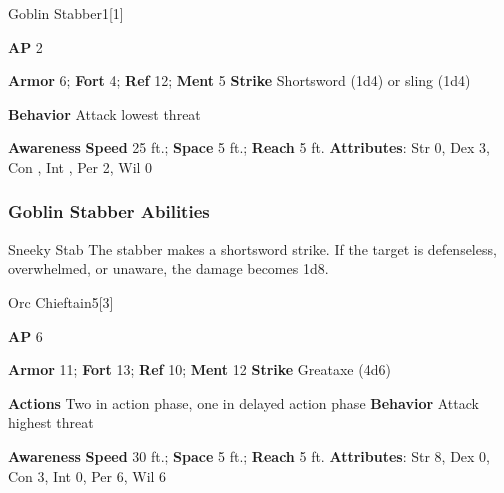 \begin{monsection}{Goblin Stabber}{1}[1]
\vspace{-1em}\vspace{-1em}
\begin{spellcontent}
\begin{spelltargetinginfo}
{\textbf{AP} 2}

\pari \textbf{Armor} 6;
\textbf{Fort} 4;
\textbf{Ref} 12;
\textbf{Ment} 5
\pari \textbf{Strike} Shortsword  (1d4) or sling  (1d4)



\pari \textbf{Behavior} Attack lowest threat
\end{spelltargetinginfo}
\end{spellcontent}

\begin{monsterfooter}
\pari \textbf{Awareness} 
\pari \textbf{Speed} 25 ft.;
\textbf{Space} 5 ft.;
\textbf{Reach} 5 ft.
\pari \textbf{Attributes}:
Str 0,
Dex 3,
Con ,
Int ,
Per 2,
Wil 0
\end{monsterfooter}
\end{monsection}


\subsubsection{Goblin Stabber Abilities}

\begin{ability}{Sneeky Stab}
The stabber makes a shortsword strike.
If the target is defenseless, overwhelmed, or unaware, the damage becomes 1d8.
\end{ability}






\begin{monsection}{Orc Chieftain}{5}[3]
\vspace{-1em}\vspace{-1em}
\begin{spellcontent}
\begin{spelltargetinginfo}
{\textbf{AP} 6}

\pari \textbf{Armor} 11;
\textbf{Fort} 13;
\textbf{Ref} 10;
\textbf{Ment} 12
\pari \textbf{Strike} Greataxe  (4d6)


\pari \textbf{Actions} Two in action phase, one in delayed action phase
\pari \textbf{Behavior} Attack highest threat
\end{spelltargetinginfo}
\end{spellcontent}

\begin{monsterfooter}
\pari \textbf{Awareness} 
\pari \textbf{Speed} 30 ft.;
\textbf{Space} 5 ft.;
\textbf{Reach} 5 ft.
\pari \textbf{Attributes}:
Str 8,
Dex 0,
Con 3,
Int 0,
Per 6,
Wil 6
\end{monsterfooter}
\end{monsection}


